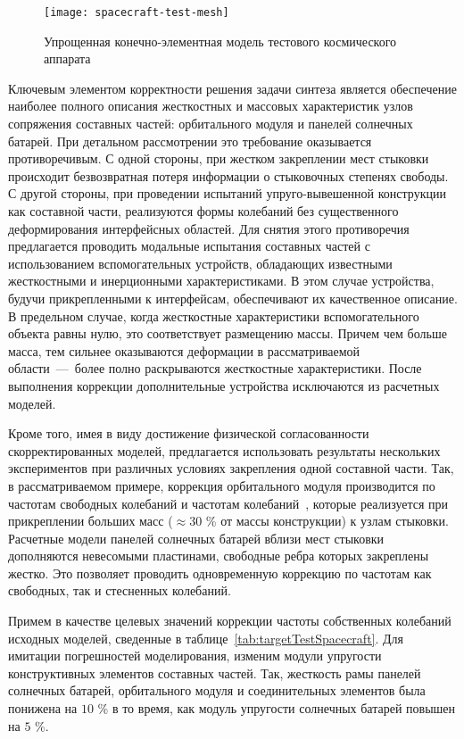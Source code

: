 \begin{figure}[!htb]
	\centering
	\texttt{[image: spacecraft-test-mesh]}
	\caption{Упрощенная конечно-элементная модель тестового космического аппарата} \label{fig:spacecraft-test-mesh}
\end{figure}

Ключевым элементом корректности решения задачи синтеза является обеспечение наиболее полного описания жесткостных и массовых характеристик узлов сопряжения составных частей: орбитального модуля и панелей солнечных батарей. При детальном рассмотрении это требование оказывается противоречивым. С одной стороны, при жестком закреплении мест стыковки происходит безвозвратная потеря информации о стыковочных степенях свободы. С другой стороны, при проведении испытаний упруго-вывешенной конструкции как составной части, реализуются формы колебаний без существенного деформирования интерфейсных областей. Для снятия этого противоречия предлагается проводить модальные испытания составных частей с использованием вспомогательных устройств, обладающих известными жесткостными и инерционными характеристиками. В этом случае устройства, будучи прикрепленными к интерфейсам, обеспечивают их качественное описание. В предельном случае, когда жесткостные характеристики вспомогательного объекта равны нулю, это соответствует размещению массы. Причем чем больше масса, тем сильнее оказываются деформации в рассматриваемой области~---~более полно раскрываются жесткостные характеристики. После выполнения коррекции дополнительные устройства исключаются из расчетных моделей.

Кроме того, имея в виду достижение физической согласованности скорректированных моделей, предлагается использовать результаты нескольких экспериментов при различных условиях закрепления одной составной части. Так, в рассматриваемом примере, коррекция орбитального модуля производится по частотам свободных колебаний и частотам колебаний~, которые реализуется при прикреплении больших масс ($ \approx 30 $ \% от массы конструкции) к узлам стыковки. Расчетные модели панелей солнечных батарей вблизи мест стыковки дополняются невесомыми пластинами, свободные ребра которых закреплены жестко. Это позволяет проводить одновременную коррекцию по частотам как свободных, так и стесненных колебаний.

Примем в качестве целевых значений коррекции частоты собственных колебаний исходных моделей, сведенные в таблице~\ref{tab:targetTestSpacecraft}. Для имитации погрешностей моделирования, изменим модули упругости конструктивных элементов составных частей. Так, жесткость рамы панелей солнечных батарей, орбитального модуля и соединительных элементов была понижена на $ 10 $ \% в то время, как модуль упругости солнечных батарей повышен на $ 5 $ \%.


